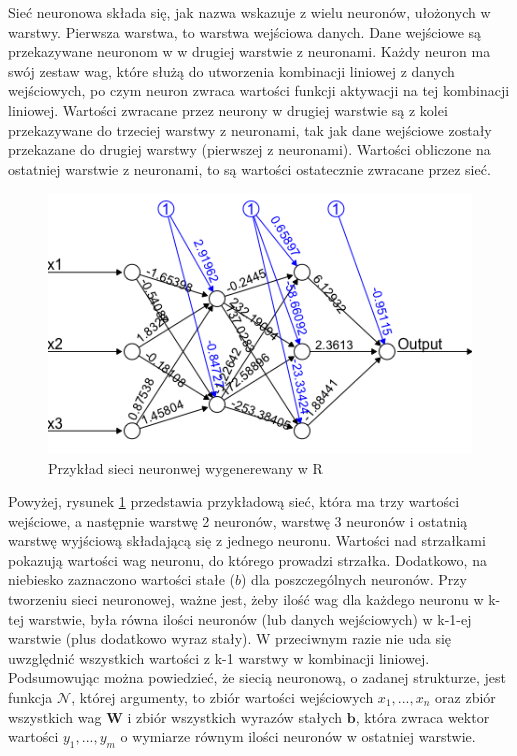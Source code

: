\documentclass[licencjacka]{pracamgr}
\begin{document}
Sieć neuronowa składa się, jak nazwa wskazuje z wielu neuronów, ułożonych w warstwy. Pierwsza warstwa, to warstwa wejściowa danych. Dane wejściowe są przekazywane neuronom w w drugiej warstwie z neuronami. Każdy neuron ma swój zestaw wag, które służą do utworzenia kombinacji liniowej z danych wejściowych, po czym neuron zwraca wartości funkcji aktywacji na tej kombinacji liniowej. Wartości zwracane przez neurony w drugiej warstwie są z kolei przekazywane do trzeciej warstwy z neuronami, tak jak dane wejściowe zostały przekazane do drugiej warstwy (pierwszej z neuronami).  Wartości obliczone na ostatniej warstwie z neuronami, to są wartości ostatecznie zwracane przez sieć. 

\begin{figure}[h!]
	\includegraphics [scale=0.7]{nn_example.png}
	\caption{Przykład sieci neuronwej wygenerewany w R}
	\label{Rys22}
\end{figure}

Powyżej, rysunek \ref{Rys22} przedstawia przykładową sieć, która ma trzy wartości wejściowe, a następnie warstwę 2 neuronów, warstwę 3 neuronów i ostatnią warstwę wyjściową składającą się z jednego neuronu. Wartości nad strzałkami pokazują wartości wag neuronu, do którego prowadzi strzałka. Dodatkowo, na niebiesko zaznaczono wartości stałe ($b$) dla poszczególnych neuronów. Przy tworzeniu sieci neuronowej, ważne jest, żeby ilość wag dla każdego neuronu w k-tej warstwie, była równa ilości neuronów (lub danych wejściowych) w k-1-ej warstwie (plus dodatkowo wyraz stały). W przeciwnym razie nie uda się uwzględnić wszystkich wartości z k-1 warstwy w kombinacji liniowej.  \\
 
Podsumowując można powiedzieć, że siecią neuronową, o zadanej strukturze, jest funkcja $\mathbf{\mathcal{N}}$, której argumenty, to zbiór wartości wejściowych $x_{1},...,x_{n}$ oraz zbiór wszystkich wag $\mathbf{W}$ i zbiór wszystkich wyrazów stałych $\mathbf{b}$, która zwraca wektor wartości $y_{1},...,y_{m}$ o wymiarze równym ilości neuronów w ostatniej warstwie.
\end{document}
